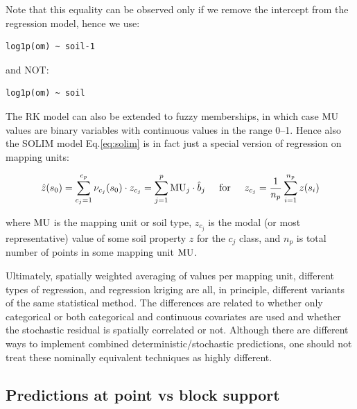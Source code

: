 \documentclass[graybox,natbib,nospthms,UStrade]{svmono}
\begin{document}
Note that this equality can be observed only if we remove the intercept
from the regression model, hence we use:

\begin{verbatim}
log1p(om) ~ soil-1
\end{verbatim}

and NOT:

\begin{verbatim}
log1p(om) ~ soil
\end{verbatim}

The RK model can also be extended to fuzzy memberships, in which case
\({\rm{MU}}\) values are binary variables with continuous values in the
range 0--1. Hence also the SOLIM model Eq.\eqref{eq:solim} is in fact just
a special version of regression on mapping units:

\begin{equation}
\hat z({{s}}_0 ) = \sum\limits_{c_j = 1}^{c_p} {\nu _{c_j} ({{s}}_0) \cdot z_{c_j} } = \sum\limits_{j = 1}^p { {\rm{MU}}_j \cdot \hat b_j}  \hspace{.5cm} {\rm {for}}  \hspace{.5cm}  z_{c_j} = \frac{1}{{n_p }}\sum\limits_{i = 1}^{n_p } {z({{s}}_i )}
\label{eq:SOLIMreg}
\end{equation}

where \({\rm{MU}}\) is the mapping unit or soil type, \(z_{c_j}\) is the
modal (or most representative) value of some soil property \(z\) for the
\(c_j\) class, and \(n_p\) is total number of points in some mapping unit
\({\rm{MU}}\).

Ultimately, spatially weighted averaging of values per mapping unit,
different types of regression, and regression kriging are all, in
principle, different variants of the same statistical method. The
differences are related to whether only categorical or both categorical
and continuous covariates are used and whether the stochastic residual
is spatially correlated or not. Although there are different ways to
implement combined deterministic/stochastic predictions, one should not
treat these nominally equivalent techniques as highly different.

\hypertarget{block-support}{%
\subsection{Predictions at point vs block support}\label{block-support}}
\end{document}
